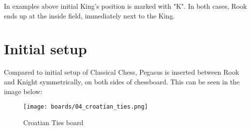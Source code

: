 In examples above initial King's position is marked with "K". In both cases, Rook ends up at the
inside field, immediately next to the King.

\clearpage %

\section*{Initial setup}

Compared to initial setup of Classical Chess, Pegasus is inserted between Rook and Knight
symmetrically, on both sides of chessboard. This can be seen in the image below:

\noindent
\begin{figure}[h]
\texttt{[image: boards/04\_croatian\_ties.png]}
\caption{Croatian Ties board}
\label{fig:04_croatian_ties}
\end{figure}

\clearpage %
